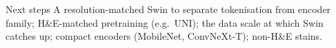 \documentclass[final]{beamer}
\newlength{\sepwidth}
\newlength{\colwidth}
\newcommand{\separatorcolumn}{\begin{column}{\sepwidth}\end{column}}
\begin{document}
\begin{frame}[t]
\begin{columns}[t]
\begin{column}{\colwidth}
  \begin{block}{Next steps}
    A resolution-matched Swin to separate tokenisation from encoder family;
    H\&E-matched pretraining (e.g.\ UNI); the data scale at which Swin catches up;
    compact encoders (MobileNet, ConvNeXt-T); non-H\&E stains.
  \end{block}

\end{column}

\separatorcolumn
\end{columns}
\end{frame}
\end{document}

